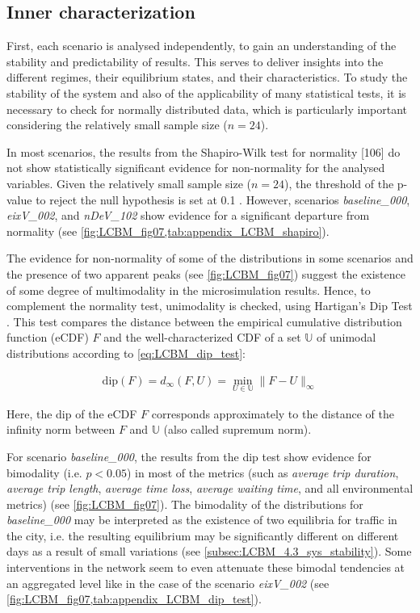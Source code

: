 \subsection{Inner characterization}
\label{subsec:LCBM_3.1_inner_characterization}

First, each scenario is analysed independently, to gain an understanding of the stability and predictability of results. This serves to deliver insights into the different regimes, their equilibrium states, and their characteristics. To study the stability of the system and also of the applicability of many statistical tests, it is necessary to check for normally distributed data, which is particularly important considering the relatively small sample size ($n=24$).

In most scenarios, the results from the Shapiro-Wilk test for normality [106] \citep{Shapiro1965} do not show statistically significant evidence for non-normality for the analysed variables. Given the relatively small sample size ($n = 24$), the threshold of the p-value to reject the null hypothesis is set at 0.1 \citep{Royall1986}. However, scenarios \emph{baseline\_000}, \emph{eixV\_002}, and \emph{nDeV\_102} show evidence for a significant departure from normality \citep{Wasserstein2016,Gomez-de-Mariscal2021} (see \cref{fig:LCBM_fig07,tab:appendix_LCBM_shapiro}).

The evidence for non-normality of some of the distributions in some scenarios and the presence of two apparent peaks (see \cref{fig:LCBM_fig07}) suggest the existence of some degree of multimodality in the microsimulation results. Hence, to complement the normality test, unimodality is checked, using Hartigan’s Dip Test \citep{Hartigan1985,Muldal2019}. This test compares the distance between the empirical cumulative distribution function (eCDF) $F$ and the well-characterized CDF of a set $\mathbb{U}$ of unimodal distributions according to \cref{eq:LCBM_dip_test}:

\begin{align}
   \text{dip}(F) = d_\infty (F, U) = \min_{U \in \mathbb{U}} \|F - U\|_\infty \label{eq:LCBM_dip_test}
\end{align}

Here, the dip of the eCDF $F$ corresponds approximately to the distance of the infinity norm between $F$ and $\mathbb{U}$ (also called supremum norm).

For scenario \emph{baseline\_000}, the results from the dip test show evidence for bimodality (i.e. $p<0.05$) in most of the metrics (such as \emph{average trip duration}, \emph{average trip length}, \emph{average time loss}, \emph{average waiting time},  and all environmental metrics) (see \cref{fig:LCBM_fig07}). The bimodality of the distributions for \emph{baseline\_000} may be interpreted as the existence of two equilibria for traffic in the city, i.e. the resulting equilibrium may be significantly different on different days as a result of small variations (see \cref{subsec:LCBM_4.3_sys_stability}). Some interventions in the network seem to even attenuate these bimodal tendencies at an aggregated level like in the case of the scenario \emph{eixV\_002} (see \cref{fig:LCBM_fig07,tab:appendix_LCBM_dip_test}).

